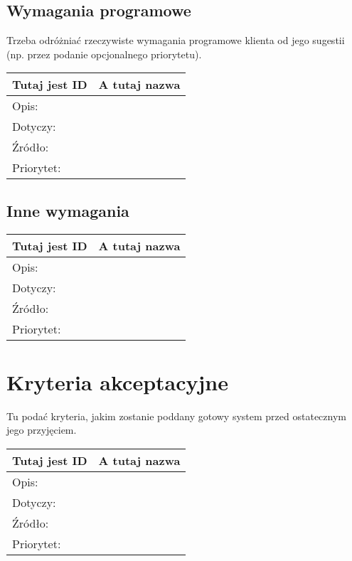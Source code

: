 \documentclass[a4paper,10pt]{article}
\begin{document}
\subsection{Wymagania programowe}

Trzeba odróżniać rzeczywiste wymagania programowe klienta od jego sugestii (np. przez podanie opcjonalnego priorytetu).

\begin{center}
\begin{tabular}{|l|l|} \hline

Tutaj jest ID & A tutaj nazwa \\ \hline
Opis: &  \\ \hline
Dotyczy: &  \\ \hline
Źródło: &  \\ \hline
Priorytet: &  \\ \hline

\end{tabular}
\end{center}

\subsection{Inne wymagania}
 
\begin{center}
\begin{tabular}{|l|l|} \hline

Tutaj jest ID & A tutaj nazwa \\ \hline
Opis: &  \\ \hline
Dotyczy: &  \\ \hline
Źródło: &  \\ \hline
Priorytet: &  \\ \hline

\end{tabular}
\end{center} 
 
\section{Kryteria akceptacyjne}

Tu podać kryteria, jakim zostanie poddany gotowy system przed ostatecznym jego przyjęciem.

\begin{center}
\begin{tabular}{|l|l|} \hline

Tutaj jest ID & A tutaj nazwa \\ \hline
Opis: &  \\ \hline
Dotyczy: &  \\ \hline
Źródło: &  \\ \hline
Priorytet: &  \\ \hline

\end{tabular}
\end{center}


\clearpage
{}
{}

\end{document}
